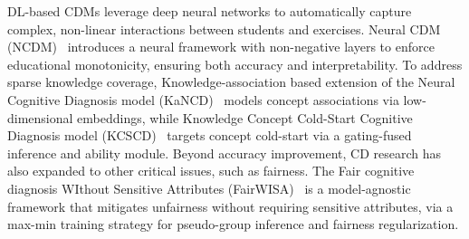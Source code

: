 \documentclass[a4paper,runningheads]{llncs}
\begin{document}
DL-based CDMs leverage deep neural networks to automatically capture complex, non-linear interactions between students and exercises.
Neural CDM (NCDM)~\cite{wang2020neural} introduces a neural framework with non-negative layers to enforce educational monotonicity, ensuring both accuracy and interpretability.
To address sparse knowledge coverage, Knowledge-association based extension of the Neural Cognitive Diagnosis model (KaNCD)~\cite{wang2022neuralcd} models concept associations via low-dimensional embeddings, while Knowledge Concept Cold-Start Cognitive Diagnosis model (KCSCD)~\cite{zhang2026knowledge} targets concept cold-start via a gating-fused inference and ability module.
Beyond accuracy improvement, CD research has also expanded to other critical issues, such as fairness. The Fair cognitive diagnosis WIthout Sensitive Attributes (FairWISA)~\cite{xu2025fairwisa} is a model-agnostic framework that mitigates unfairness without requiring sensitive attributes, via a max-min training strategy for pseudo-group inference and fairness regularization.





\end{document}
